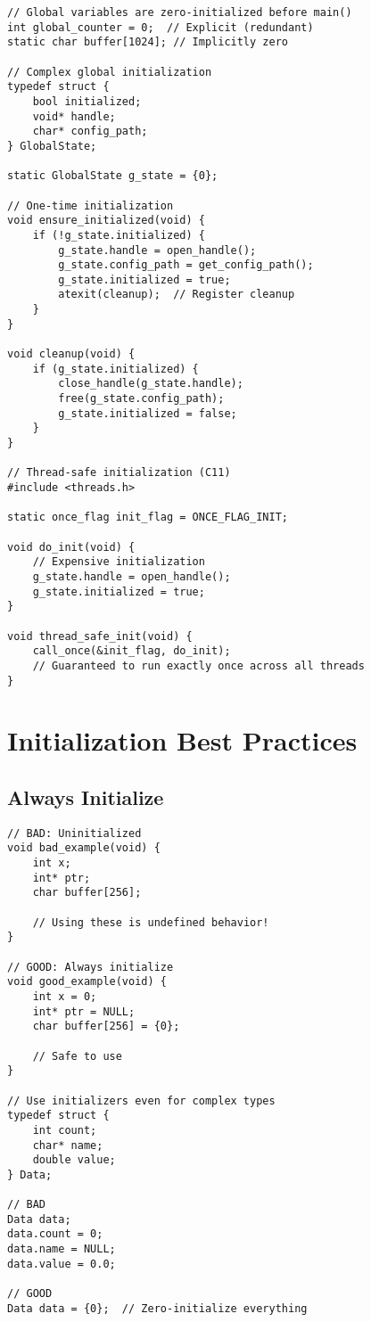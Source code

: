 \begin{lstlisting}
// Global variables are zero-initialized before main()
int global_counter = 0;  // Explicit (redundant)
static char buffer[1024]; // Implicitly zero

// Complex global initialization
typedef struct {
    bool initialized;
    void* handle;
    char* config_path;
} GlobalState;

static GlobalState g_state = {0};

// One-time initialization
void ensure_initialized(void) {
    if (!g_state.initialized) {
        g_state.handle = open_handle();
        g_state.config_path = get_config_path();
        g_state.initialized = true;
        atexit(cleanup);  // Register cleanup
    }
}

void cleanup(void) {
    if (g_state.initialized) {
        close_handle(g_state.handle);
        free(g_state.config_path);
        g_state.initialized = false;
    }
}

// Thread-safe initialization (C11)
#include <threads.h>

static once_flag init_flag = ONCE_FLAG_INIT;

void do_init(void) {
    // Expensive initialization
    g_state.handle = open_handle();
    g_state.initialized = true;
}

void thread_safe_init(void) {
    call_once(&init_flag, do_init);
    // Guaranteed to run exactly once across all threads
}
\end{lstlisting}

\section{Initialization Best Practices}

\subsection{Always Initialize}

\begin{lstlisting}
// BAD: Uninitialized
void bad_example(void) {
    int x;
    int* ptr;
    char buffer[256];

    // Using these is undefined behavior!
}

// GOOD: Always initialize
void good_example(void) {
    int x = 0;
    int* ptr = NULL;
    char buffer[256] = {0};

    // Safe to use
}

// Use initializers even for complex types
typedef struct {
    int count;
    char* name;
    double value;
} Data;

// BAD
Data data;
data.count = 0;
data.name = NULL;
data.value = 0.0;

// GOOD
Data data = {0};  // Zero-initialize everything
\end{lstlisting}

